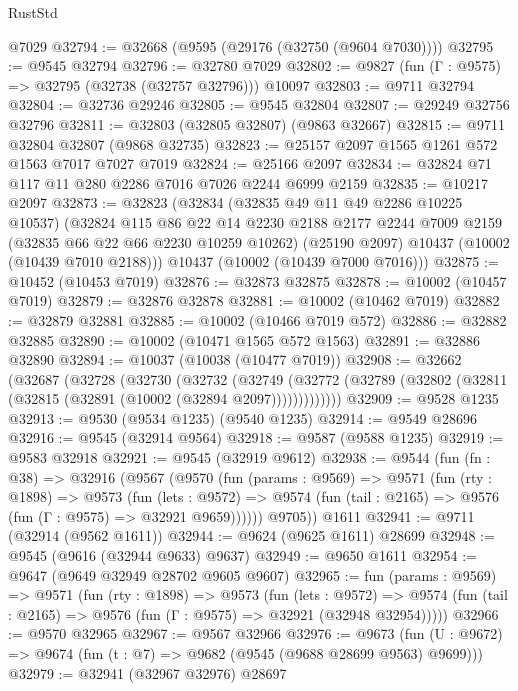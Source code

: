 \begin{lexlean}{RustStd}
\begin{coremodule}
    @7029
@32794 := @32668 (@9595 (@29176 (@32750 (@9604 @7030))))
@32795 := @9545 @32794
@32796 := @32780 @7029
@32802 := @9827 (fun (Γ : @9575) => @32795 (@32738 (@32757 @32796))) @10097
@32803 := @9711 @32794
@32804 := @32736 @29246
@32805 := @9545 @32804
@32807 := @29249 @32756 @32796
@32811 := @32803 (@32805 @32807) (@9863 @32667)
@32815 := @9711 @32804 @32807 (@9868 @32735)
@32823 := @25157 @2097 @1565 @1261 @572 @1563 @7017 @7027 @7019
@32824 := @25166 @2097
@32834 := @32824 @71 @117 @11 @280 @2286 @7016 @7026 @2244 @6999 @2159
@32835 := @10217 @2097
@32873 := @32823
    (@32834
      (@32835 @49 @11 @49 @2286 @10225 @10537)
      (@32824
        @115
        @86
        @22
        @14
        @2230
        @2188
        @2177
        @2244
        @7009
        @2159
        (@32835 @66 @22 @66 @2230 @10259 @10262)
        (@25190 @2097)
        @10437
        (@10002 (@10439 @7010 @2188)))
      @10437
      (@10002 (@10439 @7000 @7016)))
@32875 := @10452 (@10453 @7019)
@32876 := @32873 @32875
@32878 := @10002 (@10457 @7019)
@32879 := @32876 @32878
@32881 := @10002 (@10462 @7019)
@32882 := @32879 @32881
@32885 := @10002 (@10466 @7019 @572)
@32886 := @32882 @32885
@32890 := @10002 (@10471 @1565 @572 @1563)
@32891 := @32886 @32890
@32894 := @10037 (@10038 (@10477 @7019))
@32908 := @32662
    (@32687
      (@32728
        (@32730
          (@32732
            (@32749
              (@32772 (@32789 (@32802 (@32811 (@32815 (@32891 (@10002 (@32894 @2097)))))))))))))
@32909 := @9528 @1235
@32913 := @9530 (@9534 @1235) (@9540 @1235)
@32914 := @9549 @28696
@32916 := @9545 (@32914 @9564)
@32918 := @9587 (@9588 @1235)
@32919 := @9583 @32918
@32921 := @9545 (@32919 @9612)
@32938 := @9544
    (fun (fn : @38) =>
    @32916
      (@9567
        (@9570
          (fun (params : @9569) =>
          @9571
            (fun (rty : @1898) =>
            @9573
              (fun (lets : @9572) =>
              @9574 (fun (tail : @2165) => @9576 (fun (Γ : @9575) => @32921 @9659))))))
        @9705))
    @1611
@32941 := @9711 (@32914 (@9562 @1611))
@32944 := @9624 (@9625 @1611) @28699
@32948 := @9545 (@9616 (@32944 @9633) @9637)
@32949 := @9650 @1611
@32954 := @9647 (@9649 @32949 @28702 @9605 @9607)
@32965 := fun (params : @9569) =>
  @9571
    (fun (rty : @1898) =>
    @9573
      (fun (lets : @9572) =>
      @9574 (fun (tail : @2165) => @9576 (fun (Γ : @9575) => @32921 (@32948 @32954)))))
@32966 := @9570 @32965
@32967 := @9567 @32966
@32976 := @9673
    (fun (U : @9672) => @9674 (fun (t : @7) => @9682 (@9545 (@9688 @28699 @9563) @9699)))
@32979 := @32941 (@32967 @32976) @28697

\end{coremodule}
\end{lexlean}
